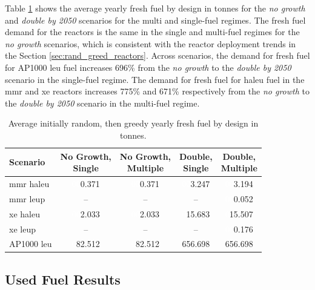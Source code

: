 Table \ref{tab:rand_greed_fresh_avg} shows the average yearly fresh fuel by design in tonnes for the \textit{no growth} and \textit{double by 2050} scenarios for the multi and single-fuel regimes. The fresh fuel demand for the reactors is the same in the single and multi-fuel regimes for the \textit{no growth} scenarios, which is consistent with the reactor deployment trends in the Section \ref{sec:rand_greed_reactors}. Across scenarios, the demand for fresh fuel for AP1000 \gls{leu} fuel increases 696\% from the \textit{no growth} to the \textit{double by 2050} scenario in the single-fuel regime. The demand for fresh fuel for \gls{haleu} fuel in the \gls{mmr} and \gls{xe} reactors increases 775\% and 671\% respectively from the \textit{no growth} to the \textit{double by 2050} scenario in the multi-fuel regime.

\begin{table}[H]
    \centering
    \caption{Average initially random, then greedy yearly fresh fuel by design in tonnes.}
    \label{tab:rand_greed_fresh_avg}
    \begin{tabular}{l c c c c}
       \toprule
       Scenario & \shortstack{No Growth,\\ Single} & \shortstack{No Growth,\\ Multiple} & \shortstack{Double,\\ Single} & \shortstack{Double,\\ Multiple}  \\
       \midrule
       \gls{mmr} \gls{haleu}   & \textcolor{white}{00}0.371    & \textcolor{white}{00}0.371   & \textcolor{white}{00}3.247    & \textcolor{white}{00}3.194    \\
       \gls{mmr} \gls{leup}    & --       & --      & --       & \textcolor{white}{00}0.052    \\
       \gls{xe} \gls{haleu}    & \textcolor{white}{00}2.033    & \textcolor{white}{00}2.033   & \textcolor{white}{0}15.683   & \textcolor{white}{0}15.507   \\
       \gls{xe} \gls{leup}     & --       & --      & --       & \textcolor{white}{00}0.176    \\
       AP1000 \gls{leu}        & \textcolor{white}{0}82.512   & \textcolor{white}{0}82.512  & 656.698  & 656.698  \\
       \bottomrule
    \end{tabular}
\end{table}


\subsection{Used Fuel Results}
\label{sec:rand_greed_used}

